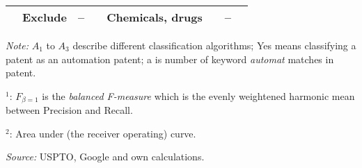 \begin{table}
\begin{small}
\begin{threeparttable}
\begin{tabular}{lrllllllllllll}
& Exclude & \multicolumn{3}{r}{--} & & \multicolumn{3}{r}{Chemicals, drugs} & & \multicolumn{3}{r}{--} \tabularnewline[0.1cm]
\bottomrule\end{tabular}
\begin{tablenotes}
\small
\item\textit{Note:} $A_1$ to $A_3$ describe different classification algorithms; Yes means classifying a patent as an automation patent; a is number of keyword \textit{automat} matches in patent.
\item $^1$: $F_{\beta = 1}$ is the \textit{balanced F-measure} which is the evenly weightened harmonic mean between Precision and Recall. 
\item $^2$: Area under (the receiver operating) curve.
\item\textit{Source:} USPTO, Google and own calculations.
\end{tablenotes}
\end{threeparttable}
\end{small}
\end{table}
